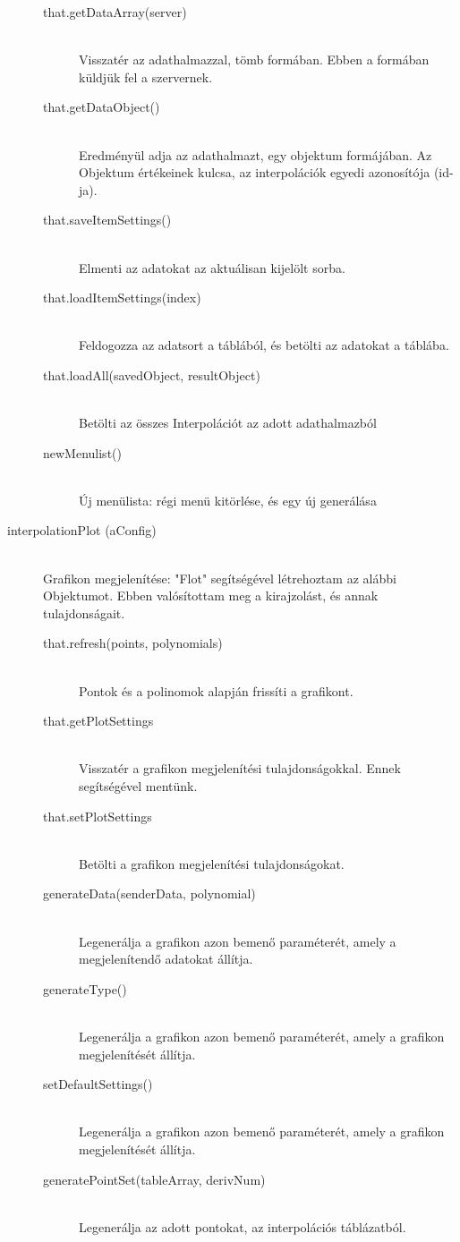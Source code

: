 \begin{description}
\begin{description}
			\item[that.getDataArray(server)] 
			\hfill \\ Visszatér az adathalmazzal, tömb formában. Ebben a formában küldjük fel a szervernek.
			\item[that.getDataObject()] 
			\hfill \\ Eredményül adja az adathalmazt, egy objektum formájában. Az Objektum értékeinek kulcsa, az interpolációk egyedi azonosítója (id-ja).
			\item[that.saveItemSettings()] 
			\hfill \\ Elmenti az adatokat az aktuálisan kijelölt sorba.
			\item[that.loadItemSettings(index)]
			\hfill \\ Feldogozza az adatsort a táblából, és betölti az adatokat a táblába.
			\item[that.loadAll(savedObject, resultObject)] 
			\hfill \\Betölti az összes Interpolációt az adott adathalmazból
			\item[newMenulist()] 
			\hfill \\
			Új menülista: régi menü kitörlése, és egy új generálása
			\hfill \\ 
			\end{description}
		\item[interpolationPlot (aConfig)]
			\hfill \\ Grafikon megjelenítése: "Flot" segítségével létrehoztam az alábbi Objektumot. Ebben valósítottam meg a kirajzolást, és annak tulajdonságait.
			\begin{description}
			\item[that.refresh(points, polynomials)]
			\hfill \\ Pontok és a polinomok alapján frissíti a grafikont.
			\item[that.getPlotSettings]
			\hfill \\ Visszatér a grafikon megjelenítési tulajdonságokkal. Ennek segítségével mentünk.
			\item[that.setPlotSettings]
			\hfill \\ Betölti a grafikon megjelenítési tulajdonságokat.
			\item[generateData(senderData, polynomial)]
			\hfill \\ Legenerálja a grafikon azon bemenő paraméterét, amely a megjelenítendő adatokat állítja.

			\item[generateType()]
			\hfill \\ Legenerálja a grafikon azon bemenő paraméterét, amely a grafikon megjelenítését állítja.
			\item[setDefaultSettings()]
			\hfill \\ Legenerálja a grafikon azon bemenő paraméterét, amely a grafikon megjelenítését állítja.
			\item[generatePointSet(tableArray, derivNum)]
			\hfill \\ Legenerálja az adott pontokat, az interpolációs táblázatból.
			\end{description}


\end{description}
